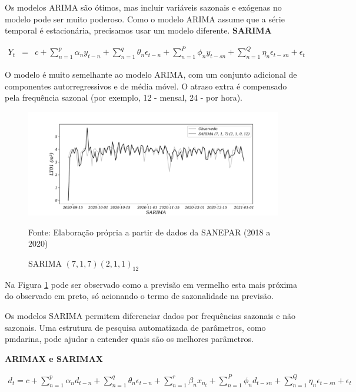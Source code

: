 Os modelos ARIMA são ótimos, mas incluir variáveis sazonais e exógenas no modelo pode ser muito poderoso. Como o modelo ARIMA assume que a série temporal é estacionária, precisamos usar um modelo diferente.
\textbf{SARIMA}

\begin{eqnarray}
	Y_t&=&c+\sum_{n=1}^p \alpha_n y_{t-n}+\sum_{n=1}^q \theta_n \epsilon_{t-n}+\sum_{n=1}^P \phi_n y_{t-s n}+\sum_{n=1}^Q \eta_n \epsilon_{t-s n}+\epsilon_t \label{sarima}
\end{eqnarray}

O modelo é muito semelhante ao modelo ARIMA, com um conjunto adicional de componentes autorregressivos e de média móvel. O atraso extra é compensado pela frequência sazonal (por exemplo, 12 - mensal, 24 - por hora). 

\begin{figure}[H]
	\centering
	\caption{SARIMA $(7,1,7) (2,1,1)_{12}$}
	\label{fig:1-sarima}
	\includegraphics[width=1\linewidth]{Modelos/Figuras/1-SARIMA}
	
	Fonte: Elaboração própria a partir de dados da SANEPAR (2018 a 2020)
\end{figure}

Na Figura \ref{fig:1-sarima} pode ser observado como a previsão em vermelho esta mais próxima do observado em preto, só acionando o termo de sazonalidade na previsão. 

Os modelos SARIMA permitem diferenciar dados por frequências sazonais e não sazonais. Uma estrutura de pesquisa automatizada de parâmetros, como pmdarina, pode ajudar a entender quais são os melhores parâmetros.

\textbf{ARIMAX e SARIMAX}

\begin{eqnarray}
	d_t=c+\sum_{n=1}^p \alpha_n d_{t-n}+\sum_{n=1}^q \theta_n \epsilon_{t-n}+\sum_{n=1}^r \beta_n x_{n_t}+\sum_{n=1}^P \phi_n d_{t-s n}+\sum_{n=1}^Q \eta_n \epsilon_{t-s n}+\epsilon_t \label{eq:sarmax}
\end{eqnarray}

